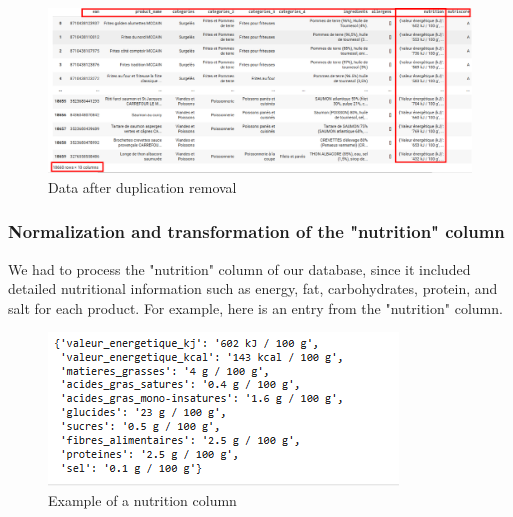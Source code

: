 \begin{center}
\begin{figure}[H]
\centering            
\includegraphics[scale=0.35]{images/duplication_remove.png}
\caption{Data after duplication removal} 
\label{fig:Duplication_remove}
\end{figure}
\end{center}

\subsubsection{Normalization and transformation of the "nutrition" column}

We had to process the "nutrition" column of our database, since it included detailed nutritional information such as energy, fat, carbohydrates, protein, and salt for each product. For example, here is an entry from the "nutrition" column.
\begin{center}
\begin{figure}[H]
\centering
\includegraphics[scale=0.66]{images/nutrition.png}
\caption{Example of a nutrition column} 
\label{fig:Nutrition_column}
\end{figure}
\end{center}

